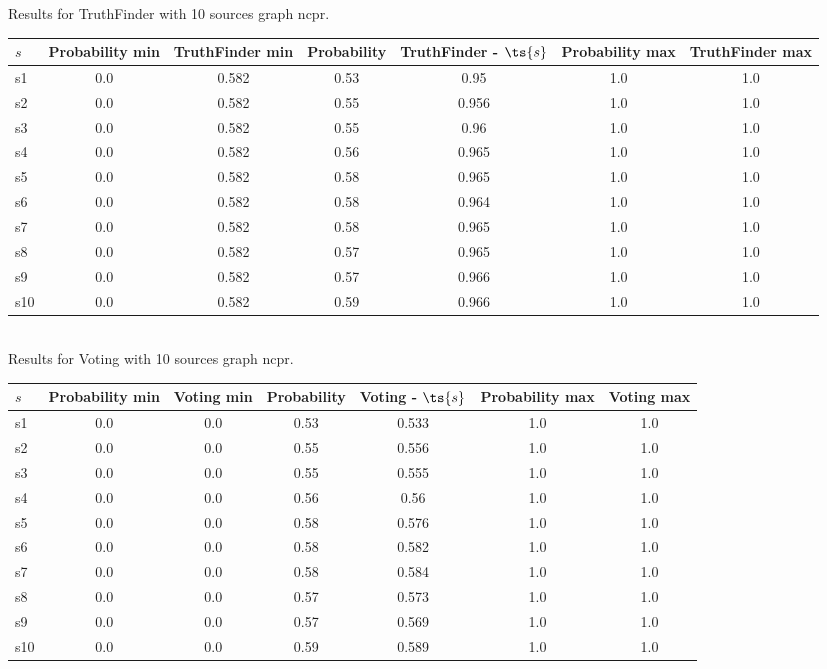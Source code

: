 \documentclass{article}
\begin{document}
\noindent Results for TruthFinder with 10 sources graph ncpr.

\noindent\begin{tabular}{|l|c|c|c|c|c|c|}
\hline
$s$& Probability min & TruthFinder min & Probability & TruthFinder - $\ts{s}$ & Probability max & TruthFinder max\\
\hline
s1 &0.0 & 0.582 & 0.53 & 0.95 & 1.0 & 1.0\\
\hline
s2 &0.0 & 0.582 & 0.55 & 0.956 & 1.0 & 1.0\\
\hline
s3 &0.0 & 0.582 & 0.55 & 0.96 & 1.0 & 1.0\\
\hline
s4 &0.0 & 0.582 & 0.56 & 0.965 & 1.0 & 1.0\\
\hline
s5 &0.0 & 0.582 & 0.58 & 0.965 & 1.0 & 1.0\\
\hline
s6 &0.0 & 0.582 & 0.58 & 0.964 & 1.0 & 1.0\\
\hline
s7 &0.0 & 0.582 & 0.58 & 0.965 & 1.0 & 1.0\\
\hline
s8 &0.0 & 0.582 & 0.57 & 0.965 & 1.0 & 1.0\\
\hline
s9 &0.0 & 0.582 & 0.57 & 0.966 & 1.0 & 1.0\\
\hline
s10 &0.0 & 0.582 & 0.59 & 0.966 & 1.0 & 1.0\\
\hline
\end{tabular}\\

\noindent Results for Voting with 10 sources graph ncpr.

\noindent\begin{tabular}{|l|c|c|c|c|c|c|}
\hline
$s$& Probability min & Voting min & Probability & Voting - $\ts{s}$ & Probability max & Voting max\\
\hline
s1 &0.0 & 0.0 & 0.53 & 0.533 & 1.0 & 1.0\\
\hline
s2 &0.0 & 0.0 & 0.55 & 0.556 & 1.0 & 1.0\\
\hline
s3 &0.0 & 0.0 & 0.55 & 0.555 & 1.0 & 1.0\\
\hline
s4 &0.0 & 0.0 & 0.56 & 0.56 & 1.0 & 1.0\\
\hline
s5 &0.0 & 0.0 & 0.58 & 0.576 & 1.0 & 1.0\\
\hline
s6 &0.0 & 0.0 & 0.58 & 0.582 & 1.0 & 1.0\\
\hline
s7 &0.0 & 0.0 & 0.58 & 0.584 & 1.0 & 1.0\\
\hline
s8 &0.0 & 0.0 & 0.57 & 0.573 & 1.0 & 1.0\\
\hline
s9 &0.0 & 0.0 & 0.57 & 0.569 & 1.0 & 1.0\\
\hline
s10 &0.0 & 0.0 & 0.59 & 0.589 & 1.0 & 1.0\\
\hline
\end{tabular}\\
\end{document}
